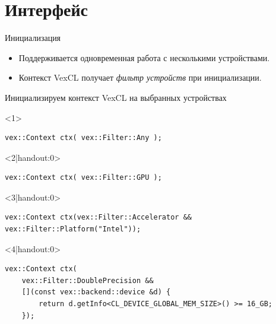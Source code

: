 \documentclass[@BEAMER_OPTIONS@]{beamer}
\begin{document}
\section{Интерфейс}

\begin{frame}
    \sectionpage
\end{frame}

\begin{frame}[fragile]{Инициализация}
    \begin{itemize}
        \item Поддерживается одновременная работа с несколькими устройствами.
        \item Контекст VexCL получает \emph{фильтр устройств} при
            инициализации.
    \end{itemize}
    \begin{overlayarea}{\textwidth}{0.4\textheight}
    \begin{exampleblock}{Инициализируем контекст VexCL на выбранных устройствах}
        \begin{onlyenv}<1>
        \begin{lstlisting}
vex::Context ctx( vex::Filter::Any );
        \end{lstlisting}
        \end{onlyenv}
        \begin{onlyenv}<2|handout:0>
        \begin{lstlisting}
vex::Context ctx( vex::Filter::GPU );
        \end{lstlisting}
        \end{onlyenv}
        \begin{onlyenv}<3|handout:0>
        \begin{lstlisting}
vex::Context ctx(vex::Filter::Accelerator && vex::Filter::Platform("Intel"));
        \end{lstlisting}
        \end{onlyenv}
        \begin{onlyenv}<4|handout:0>
        \begin{lstlisting}
vex::Context ctx(
    vex::Filter::DoublePrecision &&
    [](const vex::backend::device &d) {
        return d.getInfo<CL_DEVICE_GLOBAL_MEM_SIZE>() >= 16_GB;
    });
        \end{lstlisting}
        \end{onlyenv}
    \end{exampleblock}

\end{overlayarea}
\end{frame}
\end{document}
